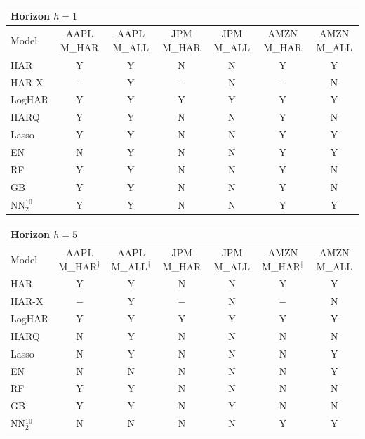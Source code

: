 \begin{tabular}{l cccccc}
\toprule
\multicolumn{7}{l}{\textbf{Horizon $h=1$}} \\
\midrule
Model & AAPL M\_HAR & AAPL M\_ALL & JPM M\_HAR & JPM M\_ALL & AMZN M\_HAR & AMZN M\_ALL \\
\midrule
HAR & Y & Y & N & N & Y & Y \\
HAR-X & $-$ & Y & $-$ & N & $-$ & N \\
LogHAR & Y & Y & Y & Y & Y & Y \\
HARQ & Y & Y & N & N & Y & N \\
Lasso & Y & Y & N & N & Y & Y \\
EN & N & Y & N & N & Y & Y \\
RF & Y & Y & N & N & Y & N \\
GB & Y & Y & N & N & Y & N \\
NN$_2^{10}$ & Y & Y & N & N & Y & Y \\
\bottomrule
\end{tabular}
\vspace{1em}

\begin{tabular}{l cccccc}
\toprule
\multicolumn{7}{l}{\textbf{Horizon $h=5$}} \\
\midrule
Model & AAPL M\_HAR$^\dagger$ & AAPL M\_ALL$^\dagger$ & JPM M\_HAR & JPM M\_ALL & AMZN M\_HAR$^\ddagger$ & AMZN M\_ALL \\
\midrule
HAR & Y & Y & N & N & Y & Y \\
HAR-X & $-$ & Y & $-$ & N & $-$ & N \\
LogHAR & Y & Y & Y & Y & Y & Y \\
HARQ & N & Y & N & N & N & N \\
Lasso & N & Y & N & N & N & Y \\
EN & N & N & N & N & N & Y \\
RF & Y & Y & N & N & N & N \\
GB & Y & Y & N & Y & N & N \\
NN$_2^{10}$ & N & N & N & N & Y & Y \\
\bottomrule
\end{tabular}
\vspace{1em}

